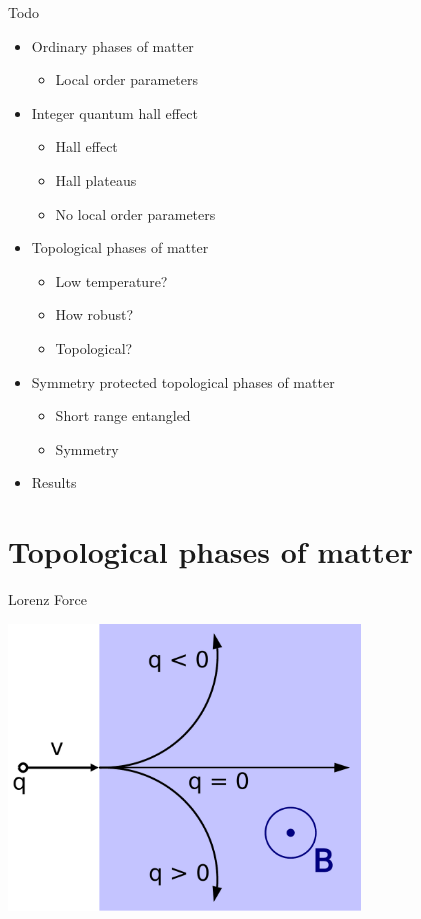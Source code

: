 \documentclass{beamer}
\begin{document}
\begin{frame}{Todo}
	\begin{itemize}
		\item[\done] Ordinary phases of matter
		\begin{itemize}
			\item[\done] Local order parameters
		\end{itemize}
		\item[\todo] Integer quantum hall effect
		\begin{itemize}
			\item[\todo] Hall effect
			\item[\todo] Hall plateaus
			\item[\todo] No local order parameters
		\end{itemize}
		\item[\todo] Topological phases of matter
		\begin{itemize}
			\item[\todo] Low temperature?
			\item[\todo] How robust?
			\item[\todo] Topological?
		\end{itemize}
		\item[\todo] Symmetry protected topological phases of matter
		\begin{itemize}
			\item[\todo] Short range entangled
			\item[\todo] Symmetry
		\end{itemize}
		\item[\todo] Results
	\end{itemize}
\end{frame}

\section{Topological phases of matter}

\begin{frame}{Lorenz Force}
	\begin{center}
		\includegraphics[width=0.7\textwidth]{Images/Lorentz_force.pdf}
	\end{center}
\end{frame}
\end{document}
